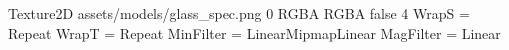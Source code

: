 Texture2D
assets/models/glass_spec.png
0
RGBA
RGBA
false
4
WrapS = Repeat
WrapT = Repeat
MinFilter = LinearMipmapLinear
MagFilter = Linear
